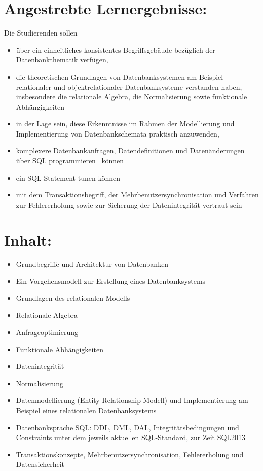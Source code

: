 \section{Angestrebte
Lernergebnisse:}\label{angestrebte-lernergebnisse-7}

Die Studierenden sollen

\begin{itemize}
\item
  über ein einheitliches konsistentes Begriffsgebäude bezüglich der
  Datenbankthematik verfügen,
\item
  die theoretischen Grundlagen von Datenbanksystemen am Beispiel
  relationaler und objektrelationaler Datenbanksysteme verstanden haben,
  insbesondere die relationale Algebra, die Normalisierung sowie
  funktionale Abhängigkeiten
\item
  in der Lage sein, diese Erkenntnisse im Rahmen der Modellierung und
  Implementierung von Datenbankschemata praktisch anzuwenden,
\item
  komplexere Datenbankanfragen, Datendefinitionen und Datenänderungen
  über SQL programmieren~ können
\item
  ein SQL-Statement tunen können
\item
  mit dem Transaktionsbegriff, der Mehrbenutzersynchronisation und
  Verfahren zur Fehlererholung sowie zur Sicherung der Datenintegrität
  vertraut sein
\end{itemize}

\section{Inhalt:}\label{inhalt-7}

\begin{itemize}
\item
  Grundbegriffe und Architektur von Datenbanken
\item
  Ein Vorgehensmodell zur Erstellung eines Datenbanksystems
\item
  Grundlagen des relationalen Modells
\item
  Relationale Algebra
\item
  Anfrageoptimierung
\item
  Funktionale Abhängigkeiten
\item
  Datenintegrität
\item
  Normalisierung
\item
  Datenmodellierung (Entity Relationship Modell) und Implementierung am
  Beispiel eines relationalen Datenbanksystems
\item
  Datenbanksprache SQL: DDL, DML, DAL, Integritätsbedingungen und
  Constraints unter dem jeweils aktuellen SQL-Standard, zur Zeit SQL2013
\item
  Transaktionskonzepte, Mehrbenutzersynchronisation, Fehlererholung und
  Datensicherheit
\end{itemize}

